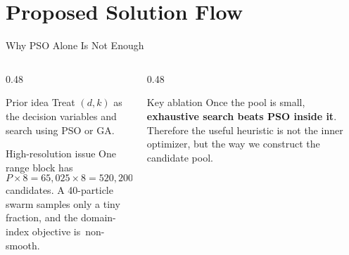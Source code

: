 \documentclass[10pt,aspectratio=169]{beamer}
\begin{document}
\section{Proposed Solution Flow}

\begin{frame}{Why PSO Alone Is Not Enough}
  \begin{columns}[T,onlytextwidth]
    \begin{column}{0.48\textwidth}
      \begin{block}{Prior idea}
        Treat $(d,k)$ as the decision variables and search using PSO or GA.
      \end{block}
      \begin{alertblock}{High-resolution issue}
        One range block has
        \[
          P\times8 = 65{,}025\times8 = 520{,}200
        \]
        candidates. A 40-particle swarm samples only a tiny fraction, and the
        domain-index objective is~non-smooth.
      \end{alertblock}
    \end{column}
    \hfill
    \begin{column}{0.48\textwidth}
      \centering
      \vspace{0.25cm}
      \begin{exampleblock}{Key ablation}
        Once the pool is small, \textbf{exhaustive search beats PSO inside it}.
        Therefore the useful heuristic is not the inner optimizer, but the way we
        construct the candidate pool.
      \end{exampleblock}
    \end{column}
  \end{columns}
\end{frame}
\end{document}
